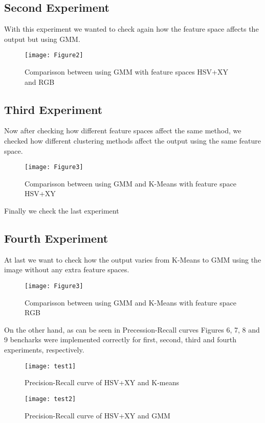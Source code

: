 \documentclass[10pt,twocolumn,letterpaper]{article}
\begin{document}
\subsection{Second Experiment}
With this experiment we wanted to check again how the feature space affects the output but using GMM.
\begin{figure}[h]
    \texttt{[image: Figure2]}
    \caption{Comparisson between using GMM with feature spaces HSV+XY and RGB}
\end{figure}

\subsection{Third Experiment}
Now after checking how different feature spaces affect the same method, we checked how different clustering methods affect the output using the same feature space.

\begin{figure}[h]
    \texttt{[image: Figure3]}
    \caption{Comparisson between using GMM and K-Means with feature space HSV+XY}
\end{figure}

Finally we check the last experiment

\subsection{Fourth Experiment}
At last we want to check how the output varies from K-Means to GMM using the image without any extra feature spaces.

\begin{figure}[h]
    \texttt{[image: Figure3]}
    \caption{Comparisson between using GMM and K-Means with feature space RGB}
\end{figure}

On the other hand, as can be seen in Precession-Recall curves Figures 6, 7, 8 and 9 bencharks were implemented correctly for first, second, third and fourth experiments, respectively. 

\begin{figure}[h]
    \texttt{[image: test1]}
    \caption{Precision-Recall curve of HSV+XY and K-means}
\end{figure}

\begin{figure}[h]
    \texttt{[image: test2]}
    \caption{Precision-Recall curve of HSV+XY and GMM}
\end{figure}
\end{document}
